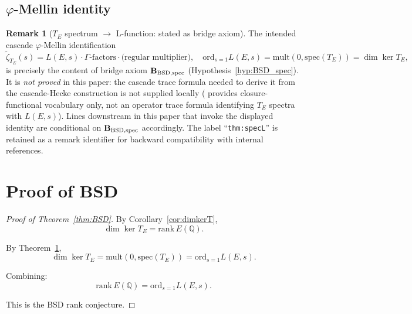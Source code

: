 \documentclass[11pt, a4paper]{amsart}
\theoremstyle{definition}
\newtheorem{remark}[theorem]{Remark}
\newcommand{\Q}{\mathbb{Q}}
\newcommand{\pphi}{\varphi}
\begin{document}
\subsection{$\pphi$-Mellin identity}

\begin{remark}[$T_E$ spectrum $\to$ L-function: stated as bridge axiom]\label{thm:specL}
The intended cascade $\pphi$-Mellin identification
\[
\tilde\zeta_{T_E}(s) = L(E, s) \cdot \Gamma\text{-factors} \cdot \text{(regular multiplier)},
\quad
\mathrm{ord}_{s=1} L(E, s) = \mathrm{mult}(0, \mathrm{spec}(T_E))
   = \dim\ker T_E,
\]
is precisely the content of bridge axiom $\mathbf{B_{\rm BSD,spec}}$
(Hypothesis~\ref{hyp:BSD_spec}). It is \emph{not proved} in this
paper: the cascade trace formula needed to derive it from
the cascade-Hecke construction is not supplied locally
(\cite{CascadeFoundations} provides closure-functional vocabulary
only, not an operator trace formula identifying $T_E$ spectra with
$L(E,s)$). Lines downstream in this paper that invoke the
displayed identity are conditional on
$\mathbf{B_{\rm BSD,spec}}$ accordingly. The label
``\texttt{thm:specL}'' is retained as a remark identifier for
backward compatibility with internal references.
\end{remark}


\section{Proof of BSD}

\begin{proof}[Proof of Theorem~\ref{thm:BSD}]
By Corollary~\ref{cor:dimkerT},
\[
\dim \ker T_E = \mathrm{rank}\, E(\Q).
\]

By Theorem~\ref{thm:specL},
\[
\dim \ker T_E = \mathrm{mult}(0, \mathrm{spec}(T_E)) = \mathrm{ord}_{s=1} L(E, s).
\]

Combining:
\[
\mathrm{rank}\, E(\Q) = \mathrm{ord}_{s=1} L(E, s).
\]

This is the BSD rank conjecture.
\end{proof}
\end{document}
